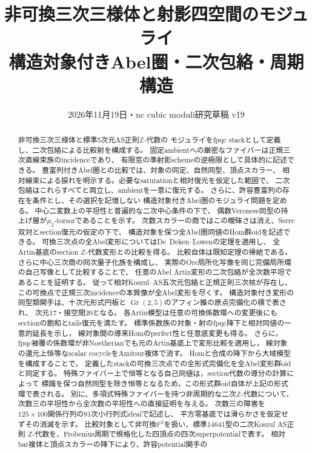 \documentclass[11pt,a4paper]{ltjsarticle}
\title{非可換三次三様体と射影四空間のモジュライ\\構造対象付きAbel圏・二次包絡・周期構造}
\author{}
\date{2026年11月19日・nc cubic moduli研究草稿 v19}
\numberwithin{equation}{section}
\newcommand{\PP}{\mathbb P}
\begin{document}
\maketitle
\begin{abstract}
非可換三次三様体と標準5次元AS正則$\mathbb Z$-代数の
モジュライをfpqc stackとして定義し、二次包絡による比較射を構成する。
固定ambientへの厳密なファイバーは正規三次直線束族のincidenceであり、
有限窓の準射影schemeの逆極限として具体的に記述できる。
豊富列付きAbel圏との比較では、対象の同定、自然同型、頂点スカラー、
相対線束による捩れを明示する。必要なsaturationと相対復元を仮定した範囲で、
二次包絡はこれらすべてと両立し、ambientを一意に復元する。
さらに、許容豊富列の存在を条件とし、その選択を記憶しない
構造対象付きAbel圏のモジュライ問題を定める。
中心二変数上の平坦性と普遍的な二次中心条件の下で、
偶数Veronese同型の持上げ層が$\mu_2$-torsorであることを示す。
次数スカラーの商ではこの曖昧さは消え、Serre双対とsection復元の仮定の下で、
構造対象を保つ全Abel圏同値のHom群oidを記述できる。
可換三次点の全Abel変形についてはDe~Deken--Lowenの定理を適用し、
全Artin基底のsection $\mathbb Z$-代数変形との比較を得る。
比較自体は既知定理の帰結である。さらに中心三次商の同次量子化族を構成し、
実際のOre局所化写像を同じ完備局所環の自己写像として比較することで、
任意のAbel Artin変形の二次包絡が全次数平坦であることを証明する。
従って相対Koszul--AS五次元包絡と正規正則三次核が存在し、
この可換点で正規三次incidenceの本質像が全Abel変形を尽くす。
構造対象付き変形の同型類関手は、十次元形式円板と
$\operatorname{Gr}(2,5)$のアフィン錐の原点完備化の積で表され、
次元17・接空間20となる。
各Artin模型は任意の可換係数環への変更後にもsectionの飽和とtails復元を満たす。
標準係数族の対象・射のfpqc降下と相対同値の一意的延長を示し，
線対象間の導来Homのperfect性と任意底変更も得る。
さらに，fpqc被覆の係数環が非Noetherianでも元のArtin基底上で変形比較を適用し，
線対象の還元上恒等なscalar cocycleをAmitsur複体で消す。
Homと合成の降下から大域模型を構成することで，
定義したstackの可換三次点での全形式完備化を全Abel変形群oidと同定する。
特殊ファイバー上で恒等となる自己同値は，section代数の導分の計算によって
標識を保つ自然同型を除き恒等となるため，この形式群oid自体が上記の形式環で表される。
別に、多項式特殊ファイバーを持つ非周期的な二次$\mathbb Z$-代数について、
次数三の平坦性から全次数の平坦性への直接証明を与える。
次数三の障害を$125\times100$関係行列の91次小行列式idealで記述し、
平方零基底では滑らかさを仮定せずその消滅を示す。
比較対象として非可換$\PP^3$を扱い、標準14641型の二次Koszul AS正則
$\mathbb Z$-代数を、Frobenius周期で規格化した四頂点の四次superpotentialで表す。
相対bar複体と頂点スカラーの降下により、許容potential関手の

\end{abstract}
\end{document}
